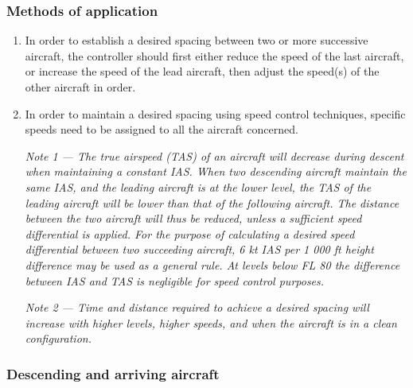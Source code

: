 \documentclass[../main.tex]{subfiles}
\begin{document}
    \subsubsection{Methods of application}

    \begin{enumerate}
        \item In order to establish a desired spacing between two or more successive aircraft, the controller should first either reduce the speed of the last aircraft, or increase the speed of the lead aircraft, then adjust the speed(s) of the other aircraft in order.
        \item In order to maintain a desired spacing using speed control techniques, specific speeds need to be assigned to all the aircraft concerned.

        \textit{Note 1 --- The true airspeed (TAS) of an aircraft will decrease during descent when maintaining a constant IAS. When two descending aircraft maintain the same IAS, and the leading aircraft is at the lower level, the TAS of the leading aircraft will be lower than that of the following aircraft. The distance between the two aircraft will thus be reduced, unless a sufficient speed differential is applied. For the purpose of calculating a desired speed differential between two succeeding aircraft, 6 kt IAS per 1 000 ft height difference may be used as a general rule. At levels below FL 80 the difference between IAS and TAS is negligible for speed control purposes.}

        \textit{Note 2 --- Time and distance required to achieve a desired spacing will increase with higher levels, higher speeds, and when the aircraft is in a clean configuration.}
    \end{enumerate}


    \subsubsection{Descending and arriving aircraft}
\end{document}
